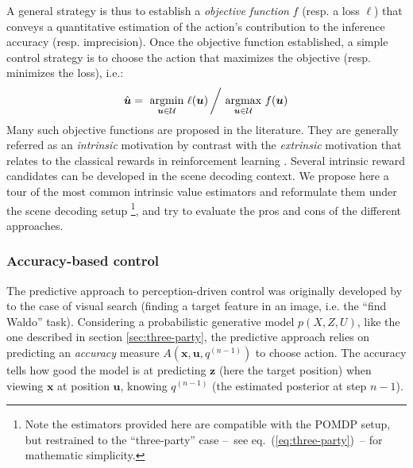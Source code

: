 \documentclass[12pt,twoside,openright]{article}
\begin{document}
A general strategy is thus to establish a \emph{objective function} $f$ (resp. a loss $\ell$) that conveys a quantitative estimation of the action's contribution to the inference accuracy (resp. imprecision). Once the objective function established, a simple control strategy is to choose the action that maximizes the objective (resp. minimizes the loss), i.e.:
\begin{align}
\hat{\boldsymbol{u}} = \underset{\boldsymbol{u}\in\mathcal{U}}{\text{ argmin }}  \ell(\boldsymbol{u})\left/ \underset{\boldsymbol{u}\in\mathcal{U}}{\text{ argmax }}  f(\boldsymbol{u})\right.
\end{align}
Many such objective functions are proposed in the literature. They are generally referred as an \emph{intrinsic} motivation \cite{oudeyer2008can} by contrast with the \emph{extrinsic} motivation that relates to the classical rewards in reinforcement learning \cite{sutton1998reinforcement}. Several intrinsic reward candidates can be developed in the scene decoding context.
We propose here a tour of the most common intrinsic value estimators and reformulate them under the scene decoding setup \footnote{Note the estimators provided here are compatible with the POMDP setup, but restrained to the ``three-party'' case --~see eq.~(\ref{eq:three-party})~-- for mathematic simplicity.}, and try to evaluate the pros and cons of the different approaches.


\subsubsection{Accuracy-based control}\label{sec:infomax}


The predictive approach to perception-driven control was originally developed by \cite{najemnik2005optimal} to the case of visual search (finding a target feature in an image, i.e. the ``find Waldo'' task).
Considering a  probabilistic generative model $p(X,Z,U)$, like the one described in section \ref{sec:three-party}, the predictive approach relies on predicting an \emph{accuracy} measure $A(\boldsymbol{x}, \boldsymbol{u}, q^{(n-1)})$ to choose action. 
The accuracy tells how good the model is at predicting $\boldsymbol{z}$ (here the target position) when viewing $\boldsymbol{x}$ at position $\boldsymbol{u}$,
knowing $q^{(n-1)}$ (the estimated posterior at step $n-1$).
\end{document}
